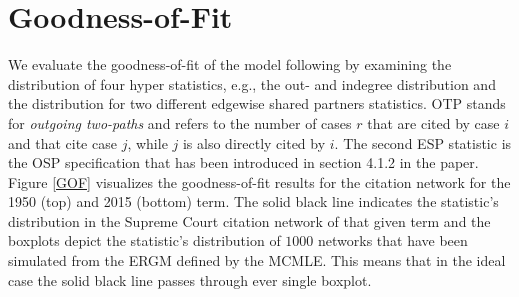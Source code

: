 \documentclass{cup-pan}
\begin{document}
\section{Goodness-of-Fit}
We evaluate the goodness-of-fit of the model following \citet{hunter2008goodness} by examining the distribution of four hyper statistics, e.g., the out- and indegree distribution and the distribution for two different edgewise shared partners statistics. OTP stands for \textit{outgoing two-paths} and refers to the number of cases $r$ that are cited by case $i$ and that cite case $j$, while $j$ is also directly cited by $i$. The second ESP statistic is the OSP specification that has been introduced in section 4.1.2 in the paper. Figure \ref{GOF} visualizes the goodness-of-fit results for the citation network for the 1950 (top) and 2015 (bottom) term. The solid black line indicates the statistic's distribution in the Supreme Court citation network of that given term and the boxplots depict the statistic's distribution of $1000$ networks that have been simulated from the ERGM defined by the MCMLE. This means that in the ideal case the solid black line passes through ever single boxplot.
\end{document}
